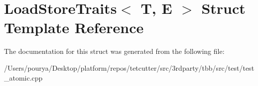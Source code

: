 \hypertarget{structLoadStoreTraits}{}\section{Load\+Store\+Traits$<$ T, E $>$ Struct Template Reference}
\label{structLoadStoreTraits}


The documentation for this struct was generated from the following file\+:\begin{DoxyCompactItemize}
\item 
/\+Users/pourya/\+Desktop/platform/repos/tetcutter/src/3rdparty/tbb/src/test/test\+\_\+atomic.\+cpp\end{DoxyCompactItemize}
